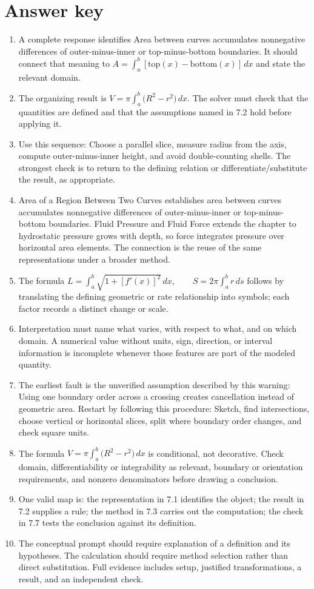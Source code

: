\documentclass[11pt]{article}
\begin{document}
\section{Answer key}
\small
\begin{enumerate}
\item A complete response identifies Area between curves accumulates nonnegative differences of outer-minus-inner or top-minus-bottom boundaries. It should connect that meaning to \(A=\int_a^b[\text{top}(x)-\text{bottom}(x)]\,dx\) and state the relevant domain.
\item The organizing result is \(V=\pi\int_a^b\bigl(R^2-r^2\bigr)\,dx\). The solver must check that the quantities are defined and that the assumptions named in 7.2 hold before applying it.
\item Use this sequence: Choose a parallel slice, measure radius from the axis, compute outer-minus-inner height, and avoid double-counting shells. The strongest check is to return to the defining relation or differentiate/substitute the result, as appropriate.
\item Area of a Region Between Two Curves establishes area between curves accumulates nonnegative differences of outer-minus-inner or top-minus-bottom boundaries. Fluid Pressure and Fluid Force extends the chapter to hydrostatic pressure grows with depth, so force integrates pressure over horizontal area elements. The connection is the reuse of the same representations under a broader method.
\item The formula \(L=\int_a^b\sqrt{1+[f'(x)]^2}\,dx,\qquad S=2\pi\int_a^b r\,ds\) follows by translating the defining geometric or rate relationship into symbols; each factor records a distinct change or scale.
\item Interpretation must name what varies, with respect to what, and on which domain. A numerical value without units, sign, direction, or interval information is incomplete whenever those features are part of the modeled quantity.
\item The earliest fault is the unverified assumption described by this warning: Using one boundary order across a crossing creates cancellation instead of geometric area. Restart by following this procedure: Sketch, find intersections, choose vertical or horizontal slices, split where boundary order changes, and check square units.
\item The formula \(V=\pi\int_a^b\bigl(R^2-r^2\bigr)\,dx\) is conditional, not decorative. Check domain, differentiability or integrability as relevant, boundary or orientation requirements, and nonzero denominators before drawing a conclusion.
\item One valid map is: the representation in 7.1 identifies the object; the result in 7.2 supplies a rule; the method in 7.3 carries out the computation; the check in 7.7 tests the conclusion against its definition.
\item The conceptual prompt should require explanation of a definition and its hypotheses. The calculation should require method selection rather than direct substitution. Full evidence includes setup, justified transformations, a result, and an independent check.
\end{enumerate}
\normalsize
\end{document}
